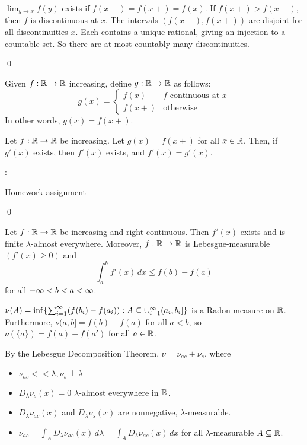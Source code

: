 \documentclass[x11names,reqno,14pt]{extarticle}
\newcommand{\seq}[2][\oo]{_{#2 = 1}^#1}
\newcommand{\cupi}[1][\oo]{\cup\seq[#1]{i}}
\begin{document}
$\lim_{y\to x}f(y)$ exists if $f(x-) = f(x+) = f(x)$. If $f(x+) > f(x-)$, then $f$ is discontinuous at $x$. The intervals $(f(x-), f(x+))$ are disjoint for all discontinuities $x$. Each contains a unique rational, giving an injection to a countable set. So there are at most countably many discontinuities. 

\qed

Given $f:\mathbb{R}\to\mathbb{R}$ increasing, define $g:\mathbb{R}\to\mathbb{R}$ as follows:
\[
g(x) = \begin{cases} f(x) & f\text{ continuous at }x \\ f(x+) & \text{otherwise} \end{cases}
\]
In other words, $g(x) = f(x+)$. 

\lem Let $f:\mathbb{R}\to\mathbb{R}$ be increasing. Let $g(x) = f(x+)$ for all $x \in \mathbb{R}$. Then, if $g'(x)$ exists, then $f'(x)$ exists, and $f'(x) = g'(x)$. 

\proof:

Homework assignment

\qed

\thm Let $f:\mathbb{R}\to\mathbb{R}$ be increasing and right-continuous. Then $f'(x)$ exists and is finite $\lambda$-almost everywhere. Moreover, $f:\mathbb{R}\to\mathbb{R}$ is Lebesgue-measurable $(f'(x)\geq0)$ and 
\[
\int_a^bf'(x)\,dx \leq f(b) - f(a)
\]
for all $-\infty<b<a<\infty$.

\proof

$\nu(A) = \inf\{\sum\seq{i}(f(b_i) - f(a_i)): A \subseteq \cupi(a_i, b_i]\}$ is a Radon measure on $\mathbb{R}$. Furthermore, $\nu(a, b] = f(b) - f(a)$ for all $a < b$, so $\nu(\{a\}) = f(a) - f(a')$ for all $a \in \mathbb{R}$.

By the Lebesgue Decomposition Theorem, $\nu = \nu_{ac} + \nu_s$, where 
\begin{itemize}

\item $\nu_{ac}<<\lambda, \nu_s\perp\lambda$ 

\item $D_{\lambda}\nu_s(x) = 0$ $\lambda$-almost everywhere in $\mathbb{R}$. 

\item $D_{\lambda}\nu_{ac}(x)$ and $D_{\lambda}\nu_s(x)$ are nonnegative, $\lambda$-measurable. 

\item $\nu_{ac} = \int_AD_\lambda\nu_{ac}(x)\,d\lambda = \int_AD_\lambda\nu_{ac}(x)\,dx$ for all $\lambda$-measurable $A \subseteq \mathbb{R}$. 

\end{itemize}
\end{document}
